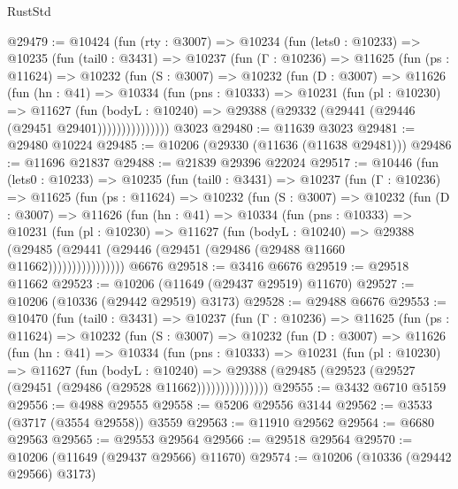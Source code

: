 \begin{lexlean}{RustStd}
\begin{coremodule}
@29479 := @10424
    (fun (rty : @3007) =>
    @10234
      (fun (lets0 : @10233) =>
      @10235
        (fun (tail0 : @3431) =>
        @10237
          (fun (Γ : @10236) =>
          @11625
            (fun (ps : @11624) =>
            @10232
              (fun (S : @3007) =>
              @10232
                (fun (D : @3007) =>
                @11626
                  (fun (hn : @41) =>
                  @10334
                    (fun (pns : @10333) =>
                    @10231
                      (fun (pl : @10230) =>
                      @11627
                        (fun (bodyL : @10240) =>
                        @29388 (@29332 (@29441 (@29446 (@29451 @29401)))))))))))))))
    @3023
@29480 := @11639 @3023
@29481 := @29480 @10224
@29485 := @10206 (@29330 (@11636 (@11638 @29481)))
@29486 := @11696 @21837
@29488 := @21839 @29396 @22024
@29517 := @10446
    (fun (lets0 : @10233) =>
    @10235
      (fun (tail0 : @3431) =>
      @10237
        (fun (Γ : @10236) =>
        @11625
          (fun (ps : @11624) =>
          @10232
            (fun (S : @3007) =>
            @10232
              (fun (D : @3007) =>
              @11626
                (fun (hn : @41) =>
                @10334
                  (fun (pns : @10333) =>
                  @10231
                    (fun (pl : @10230) =>
                    @11627
                      (fun (bodyL : @10240) =>
                      @29388
                        (@29485
                          (@29441 (@29446 (@29451 (@29486 (@29488 @11660 @11662))))))))))))))))
    @6676
@29518 := @3416 @6676
@29519 := @29518 @11662
@29523 := @10206 (@11649 (@29437 @29519) @11670)
@29527 := @10206 (@10336 (@29442 @29519) @3173)
@29528 := @29488 @6676
@29553 := @10470
    (fun (tail0 : @3431) =>
    @10237
      (fun (Γ : @10236) =>
      @11625
        (fun (ps : @11624) =>
        @10232
          (fun (S : @3007) =>
          @10232
            (fun (D : @3007) =>
            @11626
              (fun (hn : @41) =>
              @10334
                (fun (pns : @10333) =>
                @10231
                  (fun (pl : @10230) =>
                  @11627
                    (fun (bodyL : @10240) =>
                    @29388 (@29485 (@29523 (@29527 (@29451 (@29486 (@29528 @11662)))))))))))))))
@29555 := @3432 @6710 @5159
@29556 := @4988 @29555
@29558 := @5206 @29556 @3144
@29562 := @3533 (@3717 (@3554 @29558)) @3559
@29563 := @11910 @29562
@29564 := @6680 @29563
@29565 := @29553 @29564
@29566 := @29518 @29564
@29570 := @10206 (@11649 (@29437 @29566) @11670)
@29574 := @10206 (@10336 (@29442 @29566) @3173)

\end{coremodule}
\end{lexlean}
